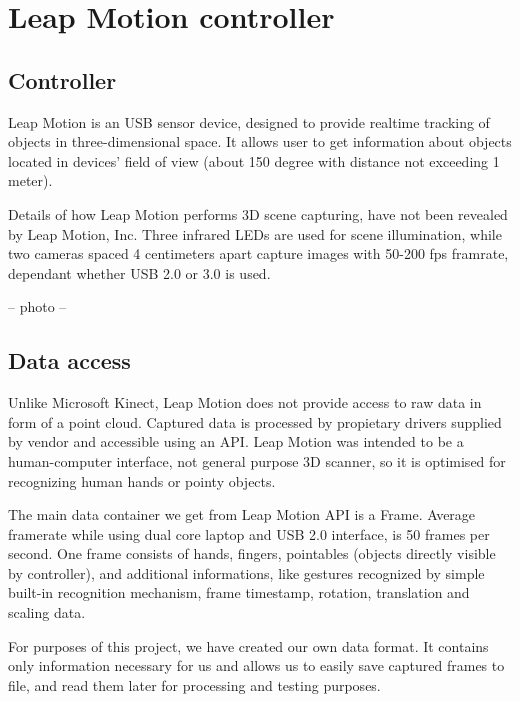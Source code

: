 \chapter{Leap Motion controller}

\section{Controller}
Leap Motion is an USB sensor device, designed to provide realtime tracking of objects in three-dimensional space. It allows user to get information about objects located in devices' field of view (about 150 degree with distance not exceeding 1 meter).

Details of how Leap Motion performs 3D scene capturing, have not been revealed by Leap Motion, Inc. Three infrared LEDs are used for scene illumination, while two cameras spaced 4 centimeters apart capture images with 50-200 fps framrate, dependant whether USB 2.0 or 3.0 is used.

-- photo -- 

\section{Data access}

Unlike Microsoft Kinect, Leap Motion does not provide access to raw data in form of a point cloud. Captured data is processed by propietary drivers supplied by vendor and accessible using an API. Leap Motion was intended to be a human-computer interface, not general purpose 3D scanner, so it is optimised for recognizing human hands or pointy objects.

The main data container we get from Leap Motion API is a Frame. Average framerate while using dual core laptop and USB 2.0 interface, is 50 frames per second. One frame consists of hands, fingers, pointables (objects directly visible by controller), and additional informations, like gestures recognized by simple built-in recognition mechanism, frame timestamp, rotation, translation and scaling data. 

For purposes of this project, we have created our own data format. It contains only information necessary for us and allows us to easily save captured frames to file, and read them later for processing and testing purposes.